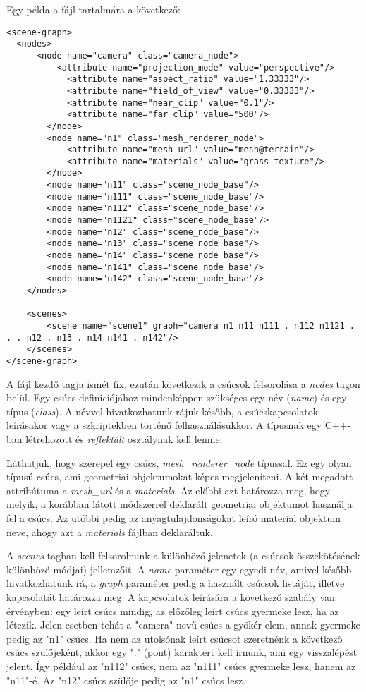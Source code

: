 \begin{description}
Egy példa a fájl tartalmára a következő:

\begin{lstlisting}
<scene-graph>
  <nodes>
	  <node name="camera" class="camera_node">
		  <attribute name="projection_mode" value="perspective"/>
			<attribute name="aspect_ratio" value="1.33333"/>
			<attribute name="field_of_view" value="0.33333"/>
			<attribute name="near_clip" value="0.1"/>
			<attribute name="far_clip" value="500"/>
		</node>
		<node name="n1" class="mesh_renderer_node">
			<attribute name="mesh_url" value="mesh@terrain"/>
			<attribute name="materials" value="grass_texture"/>
		</node>
		<node name="n11" class="scene_node_base"/>
		<node name="n111" class="scene_node_base"/>
		<node name="n112" class="scene_node_base"/>
		<node name="n1121" class="scene_node_base"/>
		<node name="n12" class="scene_node_base"/>
		<node name="n13" class="scene_node_base"/>
		<node name="n14" class="scene_node_base"/>
		<node name="n141" class="scene_node_base"/>
		<node name="n142" class="scene_node_base"/>
	</nodes>
	
	<scenes>
		<scene name="scene1" graph="camera n1 n11 n111 . n112 n1121 . . . n12 . n13 . n14 n141 . n142"/>
	</scenes>
</scene-graph>
\end{lstlisting}

A fájl kezdő tagja ismét fix, ezután következik a csúcsok felsorolása a \textit{nodes} tagon belül. Egy csúcs definiciójához mindenképpen szükséges egy név (\textit{name}) és egy típus (\textit{class}). A névvel hivatkozhatunk rájuk később, a csúcskapcsolatok leírásakor vagy a szkriptekben történő felhasználásukkor. A típusnak egy C++-ban létrehozott és \textit{reflektált} osztálynak kell lennie.

Láthatjuk, hogy szerepel egy csúcs, \textit{mesh_renderer_node} típussal. Ez egy olyan típusú csúcs, ami geometriai objektumokat képes megjeleníteni. A két megadott attribútuma a \textit{mesh_url} és a \textit{materials}. Az előbbi azt határozza meg, hogy melyik, a korábban látott módszerrel deklarált geometriai objektumot használja fel a csúcs. Az utóbbi pedig az anyagtulajdonságokat leíró material objektum neve, ahogy azt a \textit{materials} fájlban deklaráltuk.

A \textit{scenes} tagban kell felsorolnunk a különböző jelenetek (a csúcsok összekötésének különböző módjai) jellemzőit. A \textit{name} paraméter egy egyedi név, amivel később hivatkozhatunk rá, a \textit{graph} paraméter pedig a használt csúcsok listáját, illetve kapcsolatát határozza meg. A kapcsolatok leírására a következő szabály van érvényben: egy leírt csúcs mindig, az előzőleg leírt csúcs gyermeke lesz, ha az létezik. Jelen esetben tehát a "camera" nevű csúcs a gyökér elem, annak gyermeke pedig az "n1" csúcs. Ha nem az utolsónak leírt csúcsot szeretnénk a következő csúcs szülőjeként, akkor egy "." (pont) karaktert kell írnunk, ami egy visszalépést jelent. Így például az "n112" csúcs, nem az "n111" csúcs gyermeke lesz, hanem az "n11"-é. Az "n12" csúcs szülője pedig az "n1" csúcs lesz.
\end{description}


